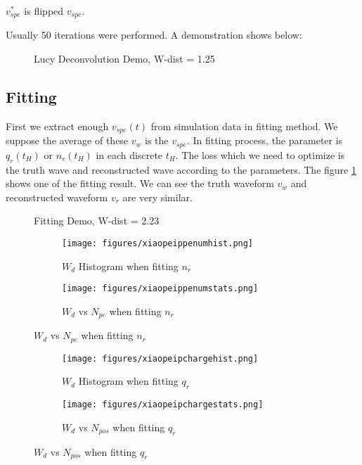 $v^{*}_{spe}$ is flipped $v_{spe}$. 

Usually 50 iterations were performed. A demonstration shows below: 

\begin{figure}[H]
    \centering
    \scalebox{0.4}{}
    \caption{Lucy Deconvolution Demo, W-dist = 1.25}
\end{figure}

\subsection{Fitting}
First we extract enough $v_{spe}(t)$ from simulation data in fitting method. We suppose the average of these $v_{w}$ is the $v_{spe}$. In fitting process, the parameter is $q_{r}(t_{H})$ or $n_{r}(t_{H})$ in each discrete $t_{H}$. The loss which we need to optimize is the truth wave and reconstructed wave according to the parameters. The figure \ref{fig:fitting} shows one of the fitting result. We can see the truth waveform $v_{w}$ and reconstructed waveform $v_{r}$ are very similar. 

\begin{figure}[H]
    \centering
    \scalebox{0.4}{}
    \caption{\label{fig:fitting} Fitting Demo, W-dist = 2.23}
\end{figure}

\begin{figure}[H]
\begin{minipage}{.5\textwidth}
\begin{figure}[H]
    \centering
        \texttt{[image: figures/xiaopeippenumhist.png]}
    \caption{$W_{d}$ Histogram when fitting $n_{r}$}
\end{figure}
\end{minipage}
\begin{minipage}{.5\textwidth}
\begin{figure}[H]
    \centering
        \texttt{[image: figures/xiaopeippenumstats.png]}
    \caption{$W_{d}$ vs $N_{pe}$ when fitting $n_{r}$}
\end{figure}
\end{minipage}
\end{figure}
\begin{figure}[H]
\begin{minipage}{.5\textwidth}
\begin{figure}[H]
    \centering
        \texttt{[image: figures/xiaopeipchargehist.png]}
    \caption{$W_{d}$ Histogram when fitting $q_{r}$}
\end{figure}
\end{minipage}
\begin{minipage}{.5\textwidth}
\begin{figure}[H]
    \centering
        \texttt{[image: figures/xiaopeipchargestats.png]}
    \caption{$W_{d}$ vs $N_{pos}$ when fitting $q_{r}$}
\end{figure}
\end{minipage}
\end{figure}

